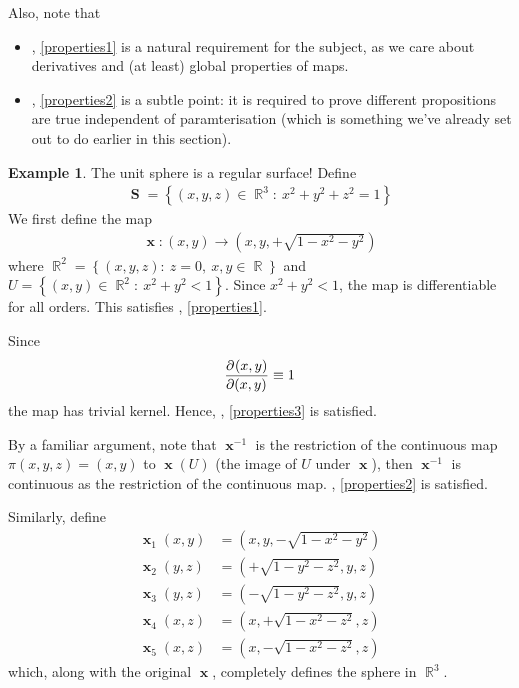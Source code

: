 \documentclass{amsart} %
\theoremstyle{mytheoremstyle}
\theoremstyle{definition}
\newtheorem{example}[definition]{Example}
\numberwithin{equation}{section}
\DeclareMathOperator{\R}{\mathbb{R}}
\DeclareMathOperator{\1}{\mathbbm{1}}
\DeclareMathOperator{\x}{\mathbf{x}}
\DeclareMathOperator{\sphere}{\mathbf{S}}
\newcommand{\condset}[4]{\left\{ #1  : \: #2 #3 #4 \right\}}
\begin{document}
Also, note that
\begin{itemize}
	\item {}, \eqref{properties1} is a natural requirement for the subject, as we care about derivatives and (at least) global properties of maps.
	\item {}, \eqref{properties2} is a subtle point: it is required to prove different propositions are true independent of paramterisation (which is something we've already set out to do earlier in this section).
\end{itemize}


\begin{example}
	The unit sphere is a regular surface! Define 
	\begin{align*}
	\sphere = \condset{(x,y,z) \in \R^3}{x^2 + y^2 + z^2}{=}{1}
	\end{align*}
	We first define the map
	\begin{align*}
		\x : (x,y) \to (x,y,+\sqrt{1-x^2-y^2})
	\end{align*}
	where $\R^2 = \condset{(x,y,z)}{z=0}{,}{ \: x,y \in \R}$ and $U = \condset{(x,y) \in \R^2}{x^2 + y^2}{<}{1}$. Since $x^2 + y^2 < 1$, the map is differentiable for all orders. This satisfies , \eqref{properties1}.
	
	Since
	\begin{align*}
		\dpd{(x,y)}{(x,y)} \equiv 1 
	\end{align*}
	the map has trivial kernel. Hence, , \eqref{properties3} is satisfied.
	
	By a familiar argument, note that $\x^{-1}$ is the restriction of the continuous map $\pi(x,y,z) = (x,y)$ to $\x(U) $ (the image of $U$ under $\x$), then $\x^{-1}$ is continuous as the restriction of the continuous map. , \eqref{properties2} is satisfied.
	
	Similarly, define
	\begin{align*}
	\x_1 (x,y) &= (x,y,-\sqrt{1-x^2-y^2}) \\
	\x_2 (y,z) &= (+\sqrt{1-y^2-z^2},y,z) \\
	\x_3 (y,z) &= (-\sqrt{1-y^2-z^2},y,z) \\
	\x_4 (x,z) &= (x,+\sqrt{1-x^2-z^2},z) \\
	\x_5 (x,z) &= (x,-\sqrt{1-x^2-z^2},z)
	\end{align*}
	which, along with the original $\x$, completely defines the sphere in $\R^3$.
\end{example}
\end{document}
